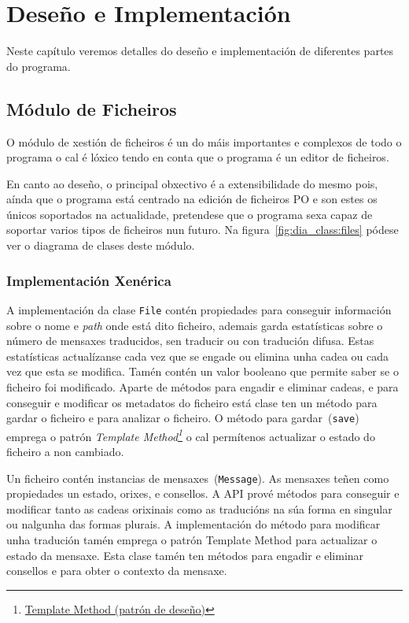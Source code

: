 \chapter{Deseño e Implementación}

Neste capítulo veremos detalles do deseño e implementación de diferentes partes do programa.

\section{Módulo de Ficheiros}

O módulo de xestión de ficheiros é un do máis importantes e complexos de todo o programa o cal é lóxico tendo en conta que o programa é un editor de ficheiros.

En canto ao deseño, o principal obxectivo é a extensibilidade do mesmo pois, aínda que o programa está centrado na edición de ficheiros PO e son estes os únicos soportados na actualidade, pretendese que o programa sexa capaz de soportar varios tipos de ficheiros nun futuro. Na figura~\ref{fig:dia_class:files} pódese ver o diagrama de clases deste módulo.

\subsection{Implementación Xenérica}
A implementación da clase \lstinline{File} contén propiedades para conseguir información sobre o nome e \emph{path} onde está dito ficheiro, ademais garda estatísticas sobre o número de mensaxes traducidos, sen traducir ou con tradución difusa. Estas estatísticas actualízanse cada vez que se engade ou elimina unha cadea ou cada vez que esta se modifica. Tamén contén un valor booleano que permite saber se o ficheiro foi modificado. Aparte de métodos para engadir e eliminar cadeas, e para conseguir e modificar os metadatos do ficheiro está clase ten un método para gardar o ficheiro e para analizar o ficheiro. O método para gardar~(\lstinline{save}) emprega o patrón \emph{Template Method\footnote{\href{http://gl.wikipedia.org/wiki/Template_Method_\%28patr\%C3\%B3n_de_dese\%C3\%B1o\%29}{Template Method (patrón de deseño)}}} o cal permítenos actualizar o estado do ficheiro a non cambiado.

Un ficheiro contén instancias de mensaxes~(\lstinline{Message}). As mensaxes teñen como propiedades un estado, orixes, e consellos. A API prové métodos para conseguir e modificar tanto as cadeas orixinais como as traducións na súa forma en singular ou nalgunha das formas plurais. A implementación do método para modificar unha tradución tamén emprega o patrón Template Method para actualizar o estado da mensaxe. Esta clase tamén ten métodos para engadir e eliminar consellos e para obter o contexto da mensaxe.

